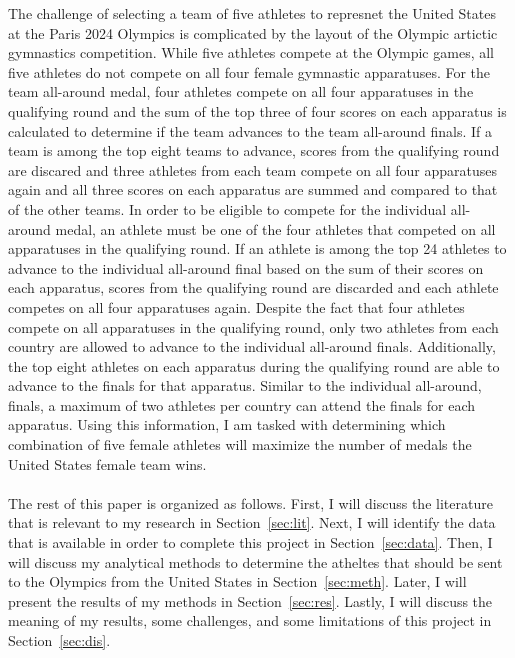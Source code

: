 \documentclass[12pt]{article}
\begin{document}
The challenge of selecting a team of five athletes to represnet the United States at the Paris 2024 Olympics is 
complicated by the layout of the Olympic artictic gymnastics competition. While five athletes compete at the 
Olympic games, all five athletes do not compete on all four female gymnastic apparatuses. For the team all-around 
medal, four athletes compete on all four apparatuses in the qualifying round and the sum of the top three of four scores 
on each apparatus is calculated to determine if the team advances to the team all-around finals. If a team 
is among the top eight teams to advance, scores from the qualifying round are discared and three athletes from each 
team compete on all four apparatuses again and all three scores on each apparatus are summed and compared to that 
of the other teams. In order to be eligible to compete for the individual all-around medal, an athlete must be 
one of the four athletes that competed on all apparatuses in the qualifying round. If an athlete is among the top 
24 athletes to advance to the individual all-around final based on the sum of their scores on each apparatus, 
scores from the qualifying round are discarded and each athlete competes on all four apparatuses again. Despite 
the fact that four athletes compete on all apparatuses in the qualifying round, only two athletes from each country 
are allowed to advance to the individual all-around finals. Additionally, the top eight athletes on each apparatus 
during the qualifying round are able to advance to the finals for that apparatus. Similar to the individual all-around, 
finals, a maximum of two athletes per country can attend the finals for each apparatus. Using this information, I am 
tasked with determining which combination of five female athletes will maximize the number of medals the United 
States female team wins.\\


\\

The rest of this paper is organized as follows. First, I will discuss the literature that is relevant to 
my research in Section~\ref{sec:lit}. Next, I will identify the data that is available in order to complete 
this project in Section~\ref{sec:data}. Then, I will discuss my 
analytical methods to determine the atheltes that should be sent to the Olympics from the United States 
in Section~\ref{sec:meth}. Later, I will present the results of my 
methods in Section~\ref{sec:res}. Lastly, I will discuss the meaning of my results, some challenges, 
and some limitations of this project in Section~\ref{sec:dis}.
\end{document}
